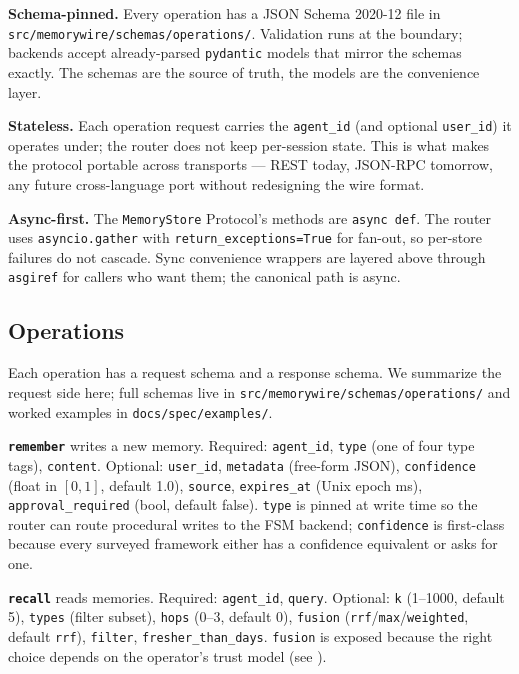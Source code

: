 \documentclass[11pt,letterpaper,twocolumn]{article}
\begin{document}
\textbf{Schema-pinned.} Every operation has a JSON Schema 2020-12 file in \texttt{src/memorywire/schemas/operations/}. Validation runs at the boundary; backends accept already-parsed \texttt{pydantic} models that mirror the schemas exactly. The schemas are the source of truth, the models are the convenience layer.

\textbf{Stateless.} Each operation request carries the \texttt{agent\_id} (and optional \texttt{user\_id}) it operates under; the router does not keep per-session state. This is what makes the protocol portable across transports --- REST today, JSON-RPC tomorrow, any future cross-language port without redesigning the wire format.

\textbf{Async-first.} The \texttt{MemoryStore} Protocol's methods are \texttt{async def}. The router uses \texttt{asyncio.gather} with \texttt{return\_exceptions=True} for fan-out, so per-store failures do not cascade. Sync convenience wrappers are layered above through \texttt{asgiref} for callers who want them; the canonical path is async.

\subsection{Operations}
\label{sec:spec-ops}

Each operation has a request schema and a response schema. We summarize the request side here; full schemas live in \texttt{src/memorywire/schemas/operations/} and worked examples in \texttt{docs/spec/examples/}.

\textbf{\texttt{remember}} writes a new memory. Required: \texttt{agent\_id}, \texttt{type} (one of four type tags), \texttt{content}. Optional: \texttt{user\_id}, \texttt{metadata} (free-form JSON), \texttt{confidence} (float in $[0,1]$, default 1.0), \texttt{source}, \texttt{expires\_at} (Unix epoch ms), \texttt{approval\_required} (bool, default false). \texttt{type} is pinned at write time so the router can route procedural writes to the FSM backend; \texttt{confidence} is first-class because every surveyed framework either has a confidence equivalent or asks for one.

\textbf{\texttt{recall}} reads memories. Required: \texttt{agent\_id}, \texttt{query}. Optional: \texttt{k} (1--1000, default 5), \texttt{types} (filter subset), \texttt{hops} (0--3, default 0), \texttt{fusion} (\texttt{rrf}/\texttt{max}/\texttt{weighted}, default \texttt{rrf}), \texttt{filter}, \texttt{fresher\_than\_days}. \texttt{fusion} is exposed because the right choice depends on the operator's trust model (see ).
\end{document}
